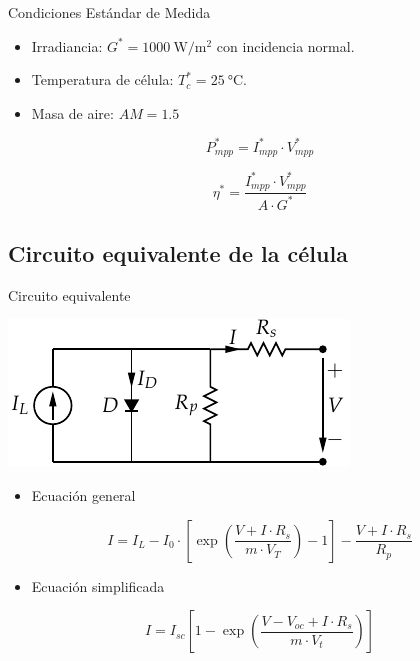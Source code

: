 \documentclass[xcolor={usenames,svgnames,dvipsnames}]{beamer}
\begin{document}
\begin{frame}[label={sec:org2aa6b1c}]{Condiciones Estándar de Medida}
\begin{itemize}
\item Irradiancia: \(G^{*}=\SI{1000}{\watt\per\meter\squared}\) con
incidencia normal.

\item Temperatura de célula: \(T_{c}^{*}=\SI{25}{\celsius}\).

\item Masa de aire: \(AM=1.5\)
\end{itemize}

$$P_{mpp}^{*}=I_{mpp}^{*}\cdot V_{mpp}^{*}$$

$$\eta^{*}=\frac{I_{mpp}^{*}\cdot V_{mpp}^{*}}{A\cdot G^{*}}$$
\end{frame}


\subsection{Circuito equivalente de la célula}
\label{sec:orgc8c44c8}

\begin{frame}[label={sec:orge928689}]{Circuito equivalente}
\begin{center}
\includegraphics[width=.9\linewidth]{../figs/ModeloElectricoCelulaSolar.pdf}
\end{center}

\begin{itemize}
\item Ecuación general
\end{itemize}

\[I=I_{L}-I_{0}\cdot[\exp(\frac{V+I\cdot R_{s}}{m\cdot
  V_{T}})-1]-\frac{V+I\cdot R_{s}}{R_{p}}\]

\begin{itemize}
\item Ecuación simplificada
\end{itemize}

$$I=I_{sc}[1-\exp(\frac{V-V_{oc}+I\cdot R_{s}}{m\cdot V_{t}})]$$
\end{frame}
\end{document}
